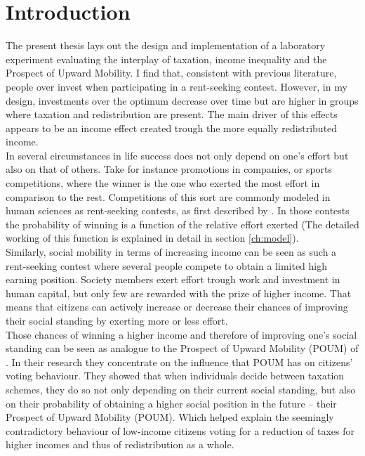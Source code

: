 \chapter{Introduction}
\thispagestyle{fancy}
\label{ch:intro}


The present thesis lays out the design and implementation of a laboratory experiment evaluating the interplay of taxation, income inequality and the Prospect of Upward Mobility. I find that, consistent with previous literature, people over invest when participating in a rent-seeking contest. However, in my design, investments over the optimum decrease over time but are higher in groups where taxation and redistribution are present. The main driver of this effects appears to be an income effect created trough the more equally redistributed income.\\

In several circumstances in life success does not only depend on one's effort but also on that of others. Take for instance promotions in companies, or sports competitions, where the winner is the one who exerted the most effort in comparison to the rest. Competitions of this sort are commonly modeled in human sciences as rent-seeking contests, as first described by \cite{tullock1980}. In those contests the probability of winning is a function of the relative effort exerted (The detailed working of this function is explained in detail in section \ref{ch:model}).\\

Similarly, social mobility in terms of increasing income can be seen as such a rent-seeking contest where several people compete to obtain a limited high earning position. Society members exert effort trough work and investment in human capital, but only few are rewarded with the prize of higher income. That means that citizens can actively increase or decrease their chances of improving their social standing by exerting more or less effort.\\

Those chances of winning a higher income and therefore of improving one's social standing can be seen as analogue to the Prospect of Upward Mobility (POUM) of \cite{benabou2001}. In their research they concentrate on the influence that POUM has on citizens' voting behaviour. They showed that when individuals decide between taxation schemes, they do so not only depending on their current social standing, but also on their probability of obtaining a higher social position in the future -- their Prospect of Upward Mobility (POUM). Which helped explain the seemingly contradictory behaviour of low-income citizens voting for a reduction of taxes for higher incomes and thus of redistribution as a whole.\\

